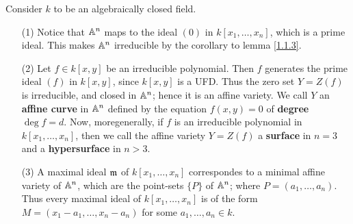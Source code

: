\begin{example}\label{example_1.4}
    Consider $k$ to be an algebraically closed field.
    \begin{enumerate}
        \item[(1)] Notice that $\mathbb{A}^n$ maps to the ideal $(0)$ in $k[x_1, \dots,
            x_n]$, which is a prime ideal. This makes $\mathbb{A}^n$ irreducible by
            the corollary to lemma \ref{1.1.3}.

        \item[(2)] Let $f \in k[x,y]$ be an irreducible polynomial. Then $f$
            generates the prime ideal  $(f)$ in $k[x,y]$, since $k[x,y]$ is a
            UFD. Thus the zero set $Y=Z(f)$ is irreducible, and closed in
            $\mathbb{A}^n$; hence it is an affine variety. We call $Y$ an
            \textbf{affine curve} in $\mathbb{A}^n$ defined by the equation $f(x,y)=0$
            of \textbf{degree} $\deg{f}=d$. Now, moregenerally, if $f$ is an
            irreducible polynomial in $k[x_1, \dots, x_n]$, then we call the
            affine variety $Y=Z(f)$ a \textbf{surface} in $n=3$ and a
            \textbf{hypersurface} in $n>3$.

        \item[(3)] A maximal ideal $\mathfrak{m}$ of $k[x_1, \dots, x_n]$ correspondes to
            a minimal affine variety of $\mathbb{A}^n$, which are the point-sets $\{P\}$
            of $\mathbb{A}^n$; where  $P=(a_1, \dots, a_n)$. Thus every maximal ideal of
            $k[x_1, \dots, x_n]$ is of the form $M=(x_1-a_1, \dots,x_n-a_n)$ for
            some $a_1, \dots, a_n \in k$.


\end{enumerate}
\end{example}
